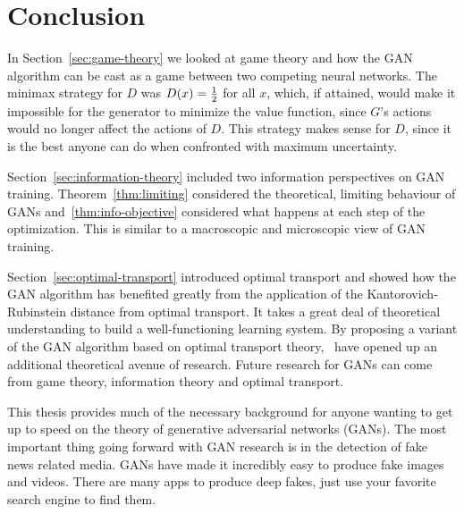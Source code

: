 \section{Conclusion}

In Section~\ref{sec:game-theory} we looked at game theory and how the GAN
algorithm can be cast as a game between two competing neural networks. The
minimax strategy for $D$ was $D(x) = {1 \over 2}$ for all $x$, which, if
attained, would make it impossible for the generator to minimize the value
function, since $G$'s actions would no longer affect the actions of $D$. This
strategy makes sense for $D$, since it is the best anyone can do when confronted
with maximum uncertainty.

Section~\ref{sec:information-theory} included two information perspectives on
GAN training. Theorem~\ref{thm:limiting} considered the theoretical, limiting
behaviour of GANs and~\ref{thm:info-objective} considered what happens at each
step of the optimization. This is similar to a macroscopic and microscopic view
of GAN training.

Section~\ref{sec:optimal-transport} introduced optimal transport and showed how
the GAN algorithm has benefited greatly from the application of the
Kantorovich-Rubinstein distance from optimal transport. It takes a great deal of
theoretical understanding to build a well-functioning learning system. By
proposing a variant of the GAN algorithm based on optimal transport
theory,~\cite{ref:arjovsky-2017} have opened up an additional theoretical avenue
of research. Future research for GANs can come from game theory, information
theory and optimal transport.

This thesis provides much of the necessary background for anyone wanting to get
up to speed on the theory of generative adversarial networks (GANs). The most
important thing going forward with GAN research is in the detection of fake news
related media. GANs have made it incredibly easy to produce fake images and
videos. There are many apps to produce deep fakes, just use your favorite search
engine to find them.


